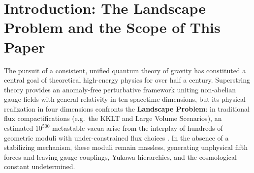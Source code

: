 \documentclass[11pt,a4paper]{article}
\theoremstyle{remark}
\begin{document}
\begin{abstract}
\textbf{Revision 5 --- verdicts.} Three later streams of the same repository test this paper's
claims, and we report their outcome here without softening it. (i)~The twining (``forger's'') test:
the ratio form of the ``27720 lock'' of , recomputed from $M_{24}$-twined
McKay--Thompson series, \emph{fails at all 25 non-identity conjugacy classes} of $M_{24}$; the lock
remains a correct arithmetic identity (Tier A) but, by the criterion that separates moonshine from
numerology, it is numerology, and we withdraw every structural or physical reading of it
(). (ii)~The literal dual-scale hypothesis fails the Cohen--Kaplan--Nelson
bound by a factor $\ge10^{30}$. (iii)~The programme's only experimental prediction --- the self-dual
length $\sqrt{\ell_P\,c/H_0}\approx47\,\mu$m read as the radius of one large extra dimension --- was
frozen before comparison (disclosed as a retrodiction) and is \emph{excluded} by the E\"ot-Wash 2020
bounds and fails the neutron-star bound; the programme's own T-duality fixes the $O(1)$ factor that
could have rescued it (). \textbf{The zero-free-parameter cosmological
conjecture, in the only form in which it makes a testable prediction, does not survive existing
data.} The formal mathematics (Tier~A) is unaffected: as of release \texttt{v3.14.0} the repository
totals 611 audited theorems across ten libraries, 0 failing, standard axioms only.
\end{abstract}

\newpage
\tableofcontents
\newpage

\section{Introduction: The Landscape Problem and the Scope of This Paper}
\label{sec:intro}

The pursuit of a consistent, unified quantum theory of gravity has constituted a central goal of
theoretical high-energy physics for over half a century. Superstring theory provides an anomaly-free
perturbative framework uniting non-abelian gauge fields with general relativity in ten spacetime
dimensions, but its physical realization in four dimensions confronts the \textbf{Landscape
Problem}: in traditional flux compactifications (e.g.\ the KKLT and Large Volume Scenarios), an
estimated $10^{500}$ metastable vacua arise from the interplay of hundreds of geometric moduli with
under-constrained flux choices \cite{Vafa2005, Douglas2003, KKLT2003}. In the absence of a
stabilizing mechanism, these moduli remain massless, generating unphysical fifth forces and leaving
gauge couplings, Yukawa hierarchies, and the cosmological constant undetermined.
\end{document}
